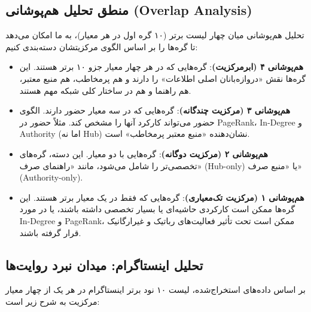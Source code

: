 \documentclass{article}
\begin{document}
	\subsection{منطق تحلیل هم‌پوشانی (Overlap Analysis)}
	تحلیل هم‌پوشانی میان چهار لیست برتر (۱۰ گره اول در هر معیار)، به ما امکان می‌دهد تا گره‌ها را بر اساس الگوی مرکزیتشان دسته‌بندی کنیم:
	
	\begin{itemize}
		\item \textbf{هم‌پوشانی ۴ (ابرمرکزیت)}: گره‌هایی که در هر چهار معیار جزو ۱۰ برتر هستند. این گره‌ها نقش «دروازه‌بانان اصلی اطلاعات» را دارند و هم پرمخاطب، هم منبع معتبر، هم راهنما و هم در ساختار کلی شبکه مهم هستند.
		\item \textbf{هم‌پوشانی ۳ (مرکزیت چندگانه)}: گره‌هایی که در سه معیار حضور دارند. الگوی حضور می‌تواند کارکرد آنها را مشخص کند. مثلاً حضور در PageRank، In-Degree و Authority (اما نه Hub) نشان‌دهنده «منبع معتبر پرمخاطب» است.
		\item \textbf{هم‌پوشانی ۲ (مرکزیت دوگانه)}: گره‌هایی با دو معیار. این دسته، گره‌های تخصصی‌تر را شامل می‌شود، مانند «راهنمای صرف» (Hub-only) یا «منبع صرف» (Authority-only).
		\item \textbf{هم‌پوشانی ۱ (مرکزیت تک‌معیاری)}: گره‌هایی که فقط در یک معیار برتر هستند. این گره‌ها ممکن است کارکردی حاشیه‌ای یا بسیار تخصصی داشته باشند، یا در مورد In-Degree و PageRank، ممکن است تحت تأثیر فعالیت‌های رباتیک و غیرارگانیک قرار گرفته باشند.
	\end{itemize}
	
	\newpage
	\subsection{تحلیل اینستاگرام: میدان نبرد روایت‌ها}
	
	بر اساس داده‌های استخراج‌شده، لیست ۱۰ نود برتر اینستاگرام در هر یک از چهار معیار مرکزیت به شرح زیر است:
	
\begingroup
\setlength{\tabcolsep}{4pt}
\small
\end{document}
